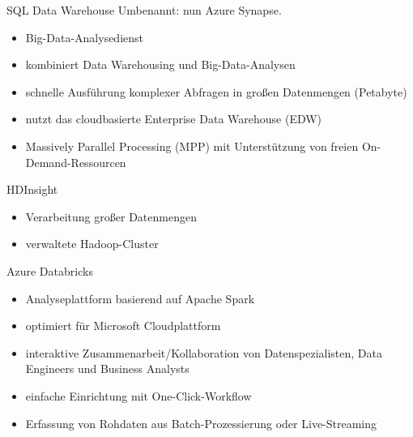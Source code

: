 \begin{flashcard}[Describe]{SQL Data Warehouse}
    Umbenannt: nun Azure Synapse.

    \begin{itemize}
        \item Big-Data-Analysedienst
        \item kombiniert Data Warehousing und Big-Data-Analysen
        \item schnelle Ausführung komplexer Abfragen in großen Datenmengen (Petabyte)
        \item nutzt das cloudbasierte Enterprise Data Warehouse (EDW)
        \item Massively Parallel Processing (MPP) mit Unterstützung von freien On-Demand-Ressourcen
    \end{itemize}
\end{flashcard}

\begin{flashcard}[Describe]{HDInsight}
    \begin{itemize}
        \item Verarbeitung großer Datenmengen
        \item verwaltete Hadoop-Cluster
    \end{itemize}
\end{flashcard}

\begin{flashcard}[Describe]{Azure Databricks}
    \begin{itemize}
        \item Analyseplattform basierend auf Apache Spark
        \item optimiert für Microsoft Cloudplattform
        \item interaktive Zusammenarbeit/Kollaboration von Datenspezialisten, Data Engineers und Business Analysts
        \item einfache Einrichtung mit One-Click-Workflow
        \item Erfassung von Rohdaten aus Batch-Prozessierung oder Live-Streaming
    \end{itemize}
\end{flashcard}

